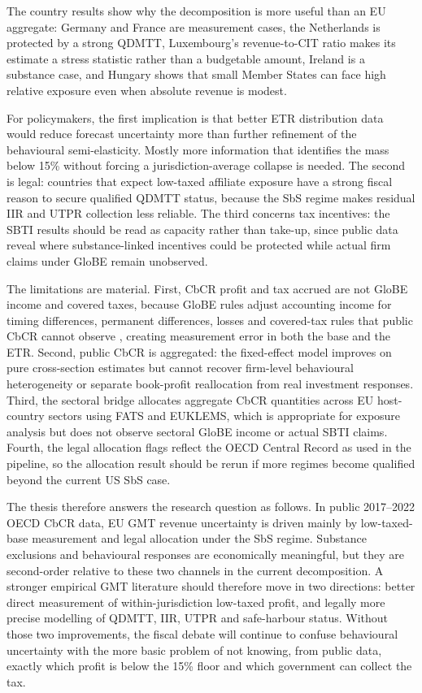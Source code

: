 \documentclass[11pt,a4paper]{article}
\begin{document}
The country results show why the decomposition is more useful than an EU aggregate: Germany and France are measurement cases, the Netherlands is protected by a strong QDMTT, Luxembourg's revenue-to-CIT ratio makes its estimate a stress statistic rather than a budgetable amount, Ireland is a substance case, and Hungary shows that small Member States can face high relative exposure even when absolute revenue is modest.

For policymakers, the first implication is that better ETR distribution data would reduce forecast uncertainty more than further refinement of the behavioural semi-elasticity. Mostly more information that identifies the mass below 15\% without forcing a jurisdiction-average collapse is needed. The second is legal: countries that expect low-taxed affiliate exposure have a strong fiscal reason to secure qualified QDMTT status, because the SbS regime makes residual IIR and UTPR collection less reliable. The third concerns tax incentives: the SBTI results should be read as capacity rather than take-up, since public data reveal where substance-linked incentives could be protected while actual firm claims under GloBE remain unobserved.

The limitations are material. First, CbCR profit and tax accrued are not GloBE income and covered taxes, because GloBE rules adjust accounting income for timing differences, permanent differences, losses and covered-tax rules that public CbCR cannot observe \citep{hanlon2023}, creating measurement error in both the base and the ETR. Second, public CbCR is aggregated: the fixed-effect model improves on pure cross-section estimates but cannot recover firm-level behavioural heterogeneity or separate book-profit reallocation from real investment responses. Third, the sectoral bridge allocates aggregate CbCR quantities across EU host-country sectors using FATS and EUKLEMS, which is appropriate for exposure analysis but does not observe sectoral GloBE income or actual SBTI claims. Fourth, the legal allocation flags reflect the OECD Central Record as used in the pipeline, so the allocation result should be rerun if more regimes become qualified beyond the current US SbS case.

The thesis therefore answers the research question as follows. In public 2017--2022 OECD CbCR data, EU GMT revenue uncertainty is driven mainly by low-taxed-base measurement and legal allocation under the SbS regime. Substance exclusions and behavioural responses are economically meaningful, but they are second-order relative to these two channels in the current decomposition. A stronger empirical GMT literature should therefore move in two directions: better direct measurement of within-jurisdiction low-taxed profit, and legally more precise modelling of QDMTT, IIR, UTPR and safe-harbour status. Without those two improvements, the fiscal debate will continue to confuse behavioural uncertainty with the more basic problem of not knowing, from public data, exactly which profit is below the 15\% floor and which government can collect the tax.
\end{document}
